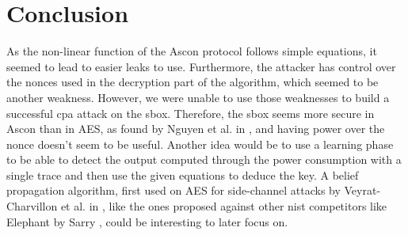 \documentclass[11pt,technote]{IEEEtran}
\begin{document}
		\section{Conclusion}
		As the non-linear function of the Ascon protocol follows simple equations, it seemed to lead to easier leaks to use. Furthermore, the attacker has control over the nonces used in the decryption part of the algorithm, which seemed to be another weakness. However, we were unable to use those weaknesses to build a successful \ac{cpa} attack on the \ac{sbox}. Therefore, the \ac{sbox} seems more secure in Ascon than in AES, as found by Nguyen et al. in \cite{cpa_analysis}, and having power over the nonce doesn't seem to be useful. Another idea would be to use a learning phase to be able to detect the output computed through the power consumption with a single trace and then use the given equations \cite{these} to deduce the key. A belief propagation algorithm, first used on AES for side-channel attacks by Veyrat-Charvillon et al. in \cite{bp_aes}, like the ones proposed against other \ac{nist} competitors like Elephant by Sarry \cite{these}, could be interesting to later focus on.
		
		\appendices
		
		 
		
				
		
		\section{}
		\printacronyms
		
\end{document}
